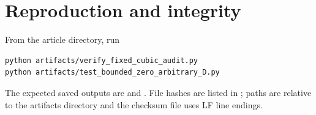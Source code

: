\section{Reproduction and integrity}

From the article directory, run
\begin{verbatim}
python artifacts/verify_fixed_cubic_audit.py
python artifacts/test_bounded_zero_arbitrary_D.py
\end{verbatim}
The expected saved outputs are
 and
.  File hashes are
listed in ; paths are relative to the artifacts
directory and the checksum file uses LF line endings.
